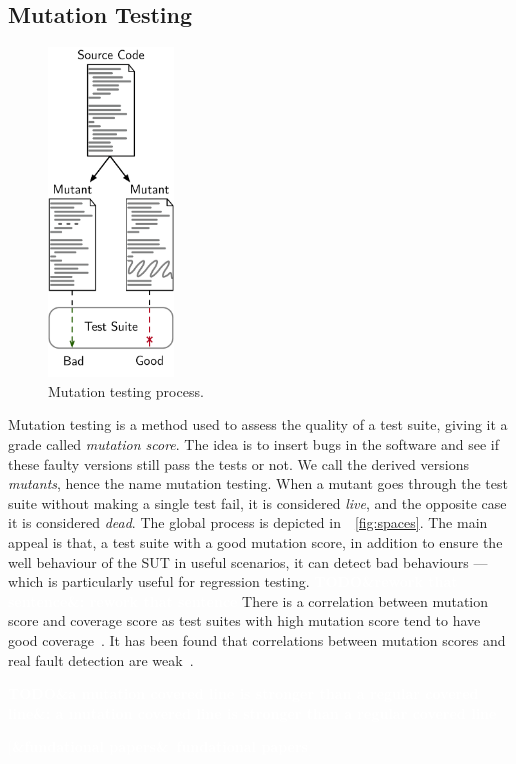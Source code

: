 \documentclass[11pt]{sdm_internship}
\newcommand{\addref}[1]{\colorbox{TealBlue!100}{\textcolor{white}{\textbf{$[$\ifx&#1&\ \else#1\fi$]$}}}}
\newcommand{\todo}[1]{\colorbox{Red!75}{\textcolor{white}{\textbf{TODO\ifx&#1&\else: #1\fi}}}}
\theoremstyle{definition}
\begin{document}
\subsection{Mutation Testing}%
\label{ssec:mutation_testing}
\begin{figure}
  \centering
  \includegraphics[width=9em]{mutation_testing_report}
  \caption{Mutation testing process.}%
\label{fig:mutation_testing}
\end{figure}
Mutation testing is a method used to assess the quality of a test suite, giving it a grade called \textit{mutation score}.
The idea is to insert bugs in the software and see if these faulty versions still pass the tests or not.
We call the derived versions \textit{mutants}, hence the name mutation testing.
When a mutant goes through the test suite without making a single test fail, it is considered \emph{live}, and the opposite case it is considered \emph{dead}.
The global process is depicted in~\figurename~\ref{fig:spaces}.
The main appeal is that, a test suite with a good mutation score, in addition to ensure the well behaviour of the SUT in useful scenarios, it can detect bad behaviours --- which is particularly useful for regression testing.
\todo{rework that sentence}
There is a correlation between mutation score and coverage score as test suites with high mutation score tend to have good coverage~\cite{assylbekov2013investigating}.
It has been found that correlations between mutation scores and real fault detection are weak~\cite{papadakis2018mutation}.

\todo{a mutation covered line is stronger than a regular covered line}

\addref{fundational papers}
\end{document}
